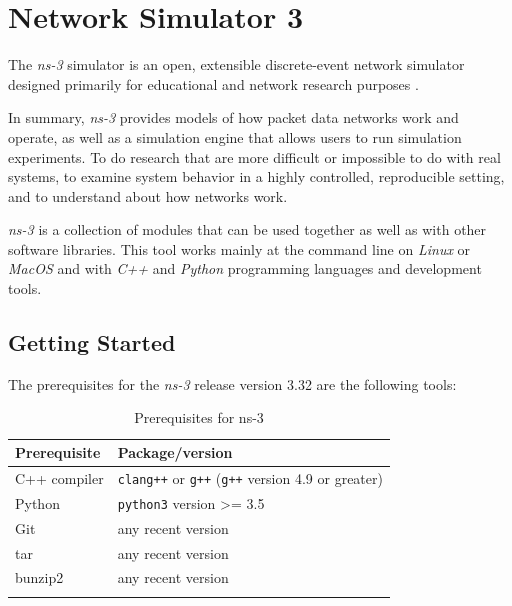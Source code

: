 \chapter{Network Simulator 3}
\label{chap:ns3}

The \textit{ns-3} simulator is an open, extensible discrete-event network simulator designed primarily 
for educational and network research purposes \cite{ns3}.

In summary, \textit{ns-3} provides models of how packet data networks work and operate, as well as a 
simulation engine that allows users to run simulation experiments. To do research that are 
more difficult or impossible to do with real systems, to examine system behavior in a highly 
controlled, reproducible setting, and to understand about how networks work.

\textit{ns-3} is a collection of modules that can be used together as well as with other software 
libraries. This tool works mainly at the command line on \textit{Linux} or \textit{MacOS} and with 
\textit{C++} and \textit{Python} programming languages and development tools.

\section{Getting Started}
\label{sec:ns3intro}

The prerequisites for the \textit{ns-3} release version 3.32 are the following tools:

\begin{table}[h]
  \centering
  \begin{tabular}{@{}ll@{}}
  \toprule
  Prerequisite & Package/version                             \\ \midrule 
  C++ compiler & \texttt{clang++} or \texttt{g++} (\texttt{g++} version 4.9 or greater) \\[-0.8em]
  Python       & \texttt{python3}  version \textgreater{}= 3.5         \\ [-0.8em]
  Git          & any recent version                          \\ [-0.8em]
  tar          & any recent version                          \\ [-0.8em]
  bunzip2      & any recent version                          \\ \bottomrule \\[-0.8em]
  \end{tabular}
  \caption{Prerequisites for ns-3}
\end{table}

